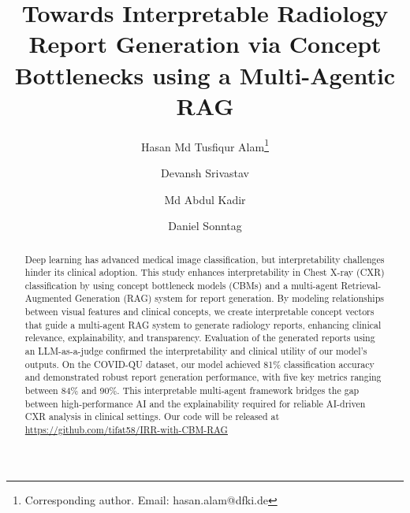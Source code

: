 \documentclass[runningheads]{llncs}
\begin{document}
%
\title{Towards Interpretable Radiology Report Generation via Concept Bottlenecks using a Multi-Agentic RAG}
%


\author{Hasan Md Tusfiqur Alam\thanks{Corresponding author. Email: hasan.alam@dfki.de}
\and
Devansh Srivastav
\and 
Md Abdul Kadir \and
Daniel Sonntag}
%
%
\maketitle              %
%
\begin{abstract}
Deep learning has advanced medical image classification, but interpretability challenges hinder its clinical adoption. This study enhances interpretability in Chest X-ray (CXR) classification by using concept bottleneck models (CBMs) and a multi-agent Retrieval-Augmented Generation (RAG) system for report generation. By modeling relationships between visual features and clinical concepts, we create interpretable concept vectors that guide a multi-agent RAG system to generate radiology reports, enhancing clinical relevance, explainability, and transparency. Evaluation of the generated reports using an LLM-as-a-judge confirmed the interpretability and clinical utility of our model’s outputs. On the COVID-QU dataset, our model achieved 81\% classification accuracy and demonstrated robust report generation performance, with five key metrics ranging between 84\% and 90\%. This interpretable multi-agent framework bridges the gap between high-performance AI and the explainability required for reliable AI-driven CXR analysis in clinical settings. Our code will be released at \href{https://github.com/tifat58/IRR-with-CBM-RAG.git}{https://github.com/tifat58/IRR-with-CBM-RAG}



\end{abstract}
\end{document}
